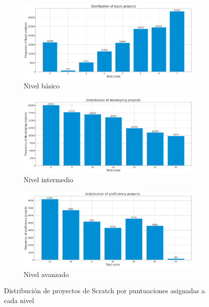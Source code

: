 \documentclass[a4paper, 12pt]{book}
\begin{document}
\begin{figure}[H]
    \centering
    \begin{subfigure}[h]{.75\textwidth} 
        \includegraphics[width=\textwidth]{img/basic_Scratch}
        \caption{Nivel básico}
        \label{fig:basic}
    \end{subfigure}       
    \begin{subfigure}[h]{.75\textwidth} 
        \includegraphics[width=\textwidth]{img/developing_Scratch}
        \caption{Nivel intermedio}
        \label{fig:developing}
    \end{subfigure}
    \begin{subfigure}[h]{.75\textwidth} 
        \includegraphics[width=\textwidth]{img/proficiency_Scratch}
        \caption{Nivel avanzado}
        \label{fig:proficiency}
    \end{subfigure}
    \caption{Distribución de proyectos de Scratch por puntuaciones asignadas a cada nivel}
\end{figure}
\end{document}
